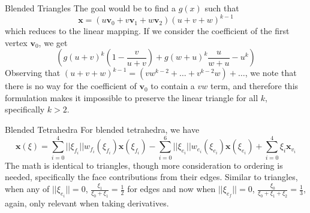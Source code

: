 \documentclass[12pt]{beamer}
\begin{document}
\begin{frame}{Blended Triangles}
The goal would be to find a $g(x)$ such that 
\[\mathbf{x} = (u\mathbf{v}_0+v\mathbf{v}_1+w\mathbf{v}_2)(u+v+w)^{k-1} \]
which reduces to the linear mapping. If we consider the coefficient of the first vertex $\mathbf{v}_0$, we get
\[\left(g(u+v)^k\left(1-\frac{v}{u+v}\right)+g(w+u)^k\frac{u}{w+u}-u^k\right)\]
Observing that $ (u+v+w)^{k-1} = (vw^{k-2}+\ldots+v^{k-2}w) + \ldots$, we note that there is no way for the coefficient of $\mathbf{v}_0$ to contain a $vw$ term, and therefore this formulation makes it impossible to preserve the linear triangle for all $k$, specifically $k > 2$.
\end{frame}
\begin{frame}{Blended Tetrahedra}
For blended tetrahedra, we have
\[\mathbf{x}(\xi) = \sum_{i=0}^{4}||\xi_{f_i}||w_{f_i}(\xi_{f_i})\mathbf{x}(\xi_{f_i}) - \sum_{i=0}^{6}||\xi_{e_i}||w_{e_i}(\xi_{e_i})\mathbf{x}(\xi_{e_i}) + \sum_{i=0}^{4}\xi_i\mathbf{x}_{v_i}\]
The math is identical to triangles, though more consideration to ordering is needed, specifically the face contributions from their edges.
Similar to triangles, when any of $||\xi_{e_i}|| = 0$, $\frac{\xi_1}{\xi_0+\xi_1} = \frac{1}{2}$ for edges and now when $||\xi_{e_f}|| = 0$, $\frac{\xi_0}{\xi_0+\xi_1+\xi_2} = \frac{1}{3}$, again, only relevant when taking derivatives.
\end{frame}
\end{document}
